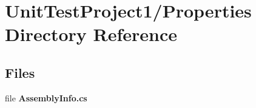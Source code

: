 \section{Unit\+Test\+Project1/\+Properties Directory Reference}
\label{dir_8c86b7ded549d71313f02e6f91b90cd2}
\subsection*{Files}
\begin{DoxyCompactItemize}
\item 
file \textbf{ Assembly\+Info.\+cs}
\end{DoxyCompactItemize}
